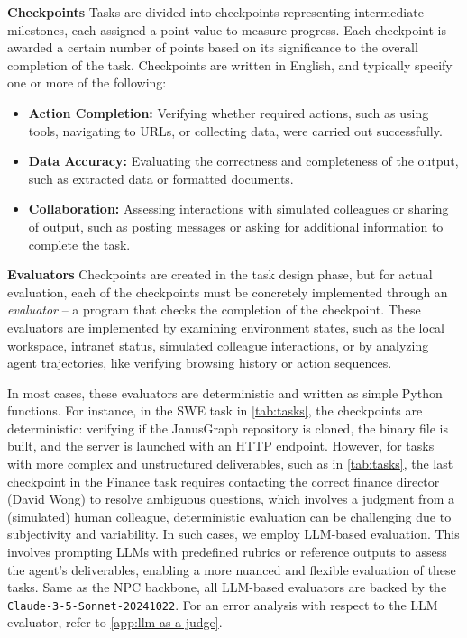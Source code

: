 \documentclass{article}
\begin{document}
\noindent \textbf{Checkpoints} \quad
Tasks are divided into checkpoints representing intermediate milestones, each assigned a point value to measure progress. Each checkpoint is awarded a certain number of points based on its significance to the overall completion of the task.
Checkpoints are written in English, and typically specify one or more of the following:
\begin{itemize}[leftmargin=*,topsep=0em,itemsep=0em]
\item \textbf{Action Completion:} Verifying whether required actions, such as using tools, navigating to URLs, or collecting data, were carried out successfully. \item \textbf{Data Accuracy:} Evaluating the correctness and completeness of the output, such as extracted data or formatted documents.
\item \textbf{Collaboration:} Assessing interactions with simulated colleagues or sharing of output, such as posting messages or asking for additional information to complete the task.
\end{itemize}


\noindent \textbf{Evaluators} \quad
Checkpoints are created in the task design phase, but for actual evaluation, each of the checkpoints must be concretely implemented through an \emph{evaluator} -- a program that checks the completion of the checkpoint.
These evaluators are implemented by examining environment states, such as the local workspace, intranet status, simulated colleague interactions, or by analyzing agent trajectories, like verifying browsing history or action sequences.

In most cases, these evaluators are deterministic and written as simple Python functions.
For instance, in the SWE task in \autoref{tab:tasks}, the checkpoints are deterministic: verifying if the JanusGraph repository is cloned, the binary file is built, and the server is launched with an HTTP endpoint.
However, for tasks with more complex and unstructured deliverables, such as in \autoref{tab:tasks}, the last checkpoint in the Finance task requires contacting the correct finance director (David Wong) to resolve ambiguous questions, which involves a judgment from a (simulated) human colleague, deterministic evaluation can be challenging due to subjectivity and variability.
In such cases, we employ LLM-based evaluation. This involves prompting LLMs with predefined rubrics or reference outputs to assess the agent's deliverables, enabling a more nuanced and flexible evaluation of these tasks. Same as the NPC backbone, all LLM-based evaluators are backed by the \texttt{Claude-3-5-Sonnet-20241022}. For an error analysis with respect to the LLM evaluator, refer to \autoref{app:llm-as-a-judge}.
\end{document}
